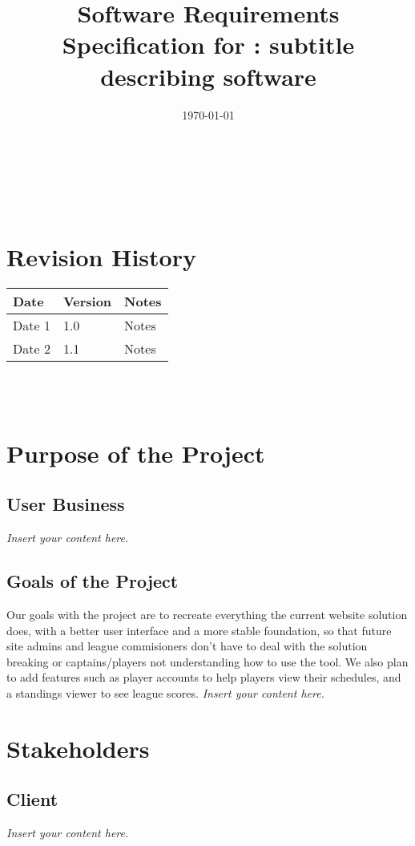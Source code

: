 \documentclass[12pt]{article}
\newcommand{\lips}{\textit{Insert your content here.}}
\begin{document}
\title{Software Requirements Specification for \progname: subtitle describing software} 
\author{\authname}
\date{\today}
	
\maketitle

~\newpage


\tableofcontents

~\newpage

\section*{Revision History}

\begin{tabularx}{\textwidth}{p{3cm}p{2cm}X}
\toprule {\textbf{Date}} & {\textbf{Version}} & {\textbf{Notes}}\\
\midrule
Date 1 & 1.0 & Notes\\
Date 2 & 1.1 & Notes\\
\bottomrule
\end{tabularx}

~\\

~\newpage
\section{Purpose of the Project}
\subsection{User Business}
\lips
\subsection{Goals of the Project}
Our goals with the project are to recreate everything the current website
solution does, with a better user interface and a more stable foundation, so
that future site admins and league commisioners don't have to deal with the
solution breaking or captains/players not understanding how to use the tool.
We also plan to add features such as player accounts to help players view
their schedules, and a standings viewer to see league scores.
\lips
\section{Stakeholders}
\subsection{Client}
\lips
\end{document}
